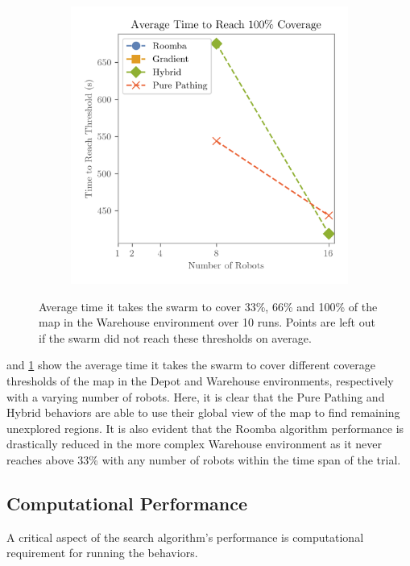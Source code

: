 \begin{figure}[H]
\begin{subfigure}[b]{\w}
    \end{subfigure}
    \begin{subfigure}[b]{\w}
        \centering
        \includegraphics[width=\textwidth]{figures/plots/benchmarks/big-coverage-1.0-warehouse.png}
    \end{subfigure}
    \caption{Average time it takes the swarm to cover 33\%, 66\% and 100\% of the map in the Warehouse environment over 10 runs. Points are left out if the swarm did not reach these thresholds on average.}
    \label{fig:warehouse-threshold}
\end{figure}

 and \cref{fig:warehouse-threshold} show the average time it takes the swarm to cover different coverage thresholds of the map in the Depot and Warehouse environments, respectively with a varying number of robots. {\color{red} Here, it is clear that the Pure Pathing and Hybrid behaviors are able to use their global view of the map to find remaining unexplored regions.} It is also evident that the Roomba algorithm performance is drastically reduced in the more complex Warehouse environment as it never reaches above 33\% with any number of robots within the time span of the trial.

\subsection{Computational Performance}
A critical aspect of the search algorithm's performance is computational requirement for running the behaviors.

